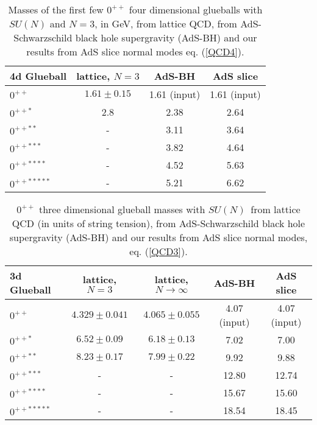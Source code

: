 \documentclass[a4paper,twocolumn,prl,groupedaddress,nofootinbib,showpacs]{revtex4}
\begin{document}
 
\begin{widetext}

\begin{table}[htbp]
\centering
\begin{tabular}{l|ccc}
4d Glueball  & lattice, $N=3$ &
AdS-BH & AdS slice \\
 \hline
 $0^{++}$ & $1.61 \pm 0.15$   & 1.61 {\rm (input)} & 1.61 {\rm (input)} \\
 $0^{++*}$ &  2.8   & 2.38 & 2.64 \\
 $0^{++**}$ &   - & 3.11 & 3.64 \\
 $0^{++***}$ &  -  & 3.82 & 4.64\\
 $0^{++****}$ &  -  & 4.52 & 5.63\\
 $0^{++*****}$ &  -  & 5.21 & 6.62\\
\end{tabular}
\parbox{6in}{\caption{ Masses of the first few $0^{++}$ four dimensional 
glueballs with $SU(N)$ and $N=3$, in GeV, from lattice QCD\cite{LAT1,LAT2}, 
from AdS-Schwarzschild black hole supergravity (AdS-BH)\cite{MASSG} 
and our results from AdS slice normal modes eq. (\ref{QCD4}).}}
\end{table}



\begin{table}[htbp]
\centering
\begin{tabular}{l|cccc}
3d Glueball & lattice, $N=3$ & lattice, $N\rightarrow \infty$ &
 AdS-BH& AdS slice \\
 \hline
 $0^{++}$ & $4.329 \pm 0.041$ & $4.065 \pm 0.055$ & 4.07 ({\rm input})
& 4.07 ({\rm input}) \\
 $0^{++*}$ & $6.52 \pm 0.09$ & $6.18 \pm 0.13$ & 7.02 & 7.00\\
 $0^{++**}$ & $8.23 \pm 0.17$ & $7.99 \pm 0.22$ & 9.92 & 9.88 \\
 $0^{++***}$ &  - & - & 12.80 & 12.74 \\
 $0^{++****}$ &  - & - & 15.67 & 15.60\\
 $0^{++*****}$ & -  & - & 18.54 & 18.45\\
\end{tabular}
\parbox{6in}{\caption{$0^{++}$ three dimensional glueball masses with 
$SU(N)\,$ from lattice QCD\cite{LAT1,LAT2} (in units of string tension), 
from AdS-Schwarzschild black hole supergravity (AdS-BH)\cite{MASSG} 
and our results from AdS slice normal modes, eq. (\ref{QCD3}). }}
\end{table}

\end{widetext}   
\end{document}
